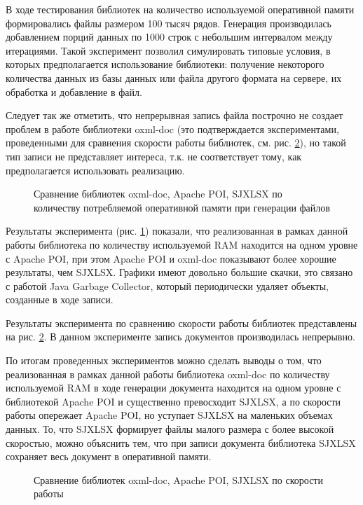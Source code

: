 \documentclass[14pt]{matmex-diploma-custom}
\begin{document}
В ходе тестирования библиотек на количество используемой оперативной памяти формировались файлы размером 100 тысяч рядов. Генерация производилась добавлением порций данных по 1000 строк с небольшим интервалом между итерациями. Такой эксперимент позволил симулировать типовые условия, в которых предполагается использование библиотеки: получение некоторого количества данных из базы данных или файла другого формата на сервере, их обработка и добавление в файл. 

Следует так же отметить, что непрерывная запись файла построчно не создает проблем в работе библиотеки oxml-doc (это подтверждается экспериментами, проведенными для сравнения скорости работы библиотек, см. рис. \ref{speed}), но такой тип записи не представляет интереса, т.к. не соответствует тому, как предполагается использовать реализацию. 

\begin{figure}[h]
    \centering    
    \def\svgwidth{\columnwidth}
    
    \caption{Сравнение библиотек oxml-doc, Apache POI, SJXLSX по количеству потребляемой оперативной памяти при генерации файлов \label{triple}}
\end{figure}

Результаты эксперимента (рис. \ref{triple}) показали, что реализованная в рамках данной работы библиотека по количеству используемой RAM находится на одном уровне с Apache POI, при этом Apache POI и oxml-doc показывают более хорошие результаты, чем SJXLSX. Графики имеют довольно большие скачки, это связано с работой Java Garbage Collector, который периодически удаляет объекты, созданные в ходе записи.

Результаты эксперимента по сравнению скорости работы библиотек представлены на рис. \ref{speed}. В данном эксперименте запись документов производилась непрерывно.

По итогам проведенных экспериментов можно сделать выводы о том, что реализованная в рамках данной работы библиотека oxml-doc по количеству используемой RAM в ходе генерации документа находится на одном уровне с библиотекой Apache POI и существенно превосходит SJXLSX, а по скорости работы опережает Apache POI, но уступает SJXLSX на маленьких объемах данных. То, что SJXLSX формирует файлы малого размера с более высокой скоростью, можно объяснить тем, что при записи документа библиотека SJXLSX сохраняет весь документ в оперативной памяти.
\begin{figure}[h]
    \centering    
    \def\svgwidth{\columnwidth}
    
    \caption{Сравнение библиотек oxml-doc, Apache POI, SJXLSX по скорости работы \label{speed}}
\end{figure}
\end{document}
